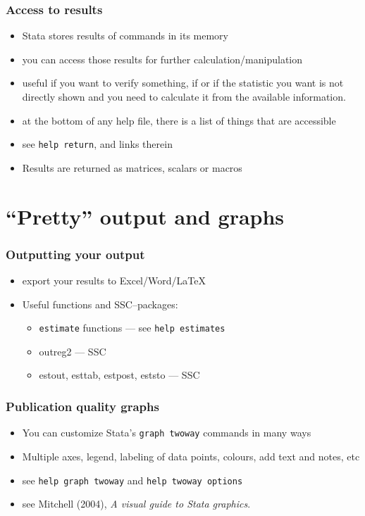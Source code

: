 \documentclass[pdftex, compress]{beamer}
\begin{document}
\begin{frame}
\frametitle{Access to results}
	\begin{itemize}
		\item Stata stores results of commands in its memory
		\item you can access those results for further calculation/manipulation
		\item useful if you want to verify something, if or if the statistic you want is not directly shown and you need to calculate it from the available information.
		\item at the bottom of any help file, there is a list of things that are accessible
		\item see \texttt{help return}, and links therein
		\item Results are returned as matrices, scalars or macros
	\end{itemize}
\end{frame}

\section{``Pretty'' output and graphs}

\begin{frame}
\frametitle{Outputting your output}
	\begin{itemize}
		\item export your results to Excel/Word/\LaTeX
		\item Useful functions and SSC--packages:
		\begin{itemize}
			\item \texttt{estimate} functions --- see \texttt{help estimates}
			\item outreg2 --- SSC
			\item estout, esttab, estpost, eststo --- SSC
		\end{itemize}
	\end{itemize}
\end{frame}

\begin{frame}
\frametitle{Publication quality graphs}
	\begin{itemize}
		\item You can customize Stata's \texttt{graph twoway} commands in \alert{many} ways
		\item Multiple axes, legend, labeling of data points, colours, add text and notes, etc 
		\item see \texttt{help graph twoway} and \texttt{help twoway options}
		\item see Mitchell (2004), \textit{A visual guide to Stata graphics}.
	\end{itemize}
\end{frame}
\end{document}
